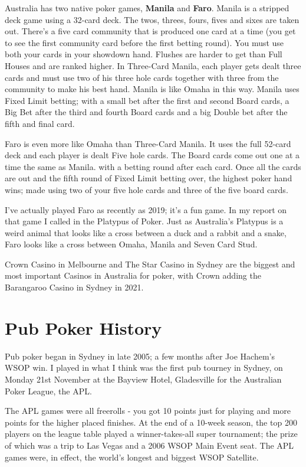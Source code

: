 Australia has two native poker games, \textbf{Manila} and
\textbf{Faro}. Manila is a stripped deck game using a 32-card
deck. The twos, threes, fours, fives and sixes are taken out.
There's a five card community that is produced one card at a time (you
get to see the first community card before the first betting round).
You must use both your cards in your showdown hand. Flushes are harder
to get than Full Houses and are ranked higher. In Three-Card Manila,
each player gets dealt three cards and must use two of his three hole
cards together with three from the community to make his best
hand. Manila is like Omaha in this way. Manila uses Fixed Limit
betting; with a small bet after the first and second Board cards, a
Big Bet after the third and fourth Board cards and a big Double bet
after the fifth and final card.

Faro is even more like Omaha than Three-Card Manila. It uses the full
52-card deck and each player is dealt Five hole cards. The Board
cards come out one at a time the same as Manila. with a betting round
after each card. Once all the cards are out and the fifth round of
Fixed Limit betting over, the highest poker hand wins; made using two
of your five hole cards and three of the five board cards.

I've actually played Faro as recently as 2019; it's a
fun game. In my report on that game I called in the Platypus of
Poker. Just as Australia's Platypus is a weird animal that looks like
a cross between a duck and a rabbit and a snake, Faro looks like a
cross between Omaha, Manila and Seven Card Stud.

Crown Casino in Melbourne and The Star Casino in Sydney are the
biggest and most important Casinos in Australia for poker, with Crown
adding the Barangaroo Casino in Sydney in 2021.

\section{Pub Poker History}

Pub poker began in Sydney in late 2005; a few months after Joe
Hachem's WSOP win. I played in what I think was the first pub tourney
in Sydney, on Monday 21st November at the Bayview Hotel, Gladesville
for the Australian Poker League, the APL.

The APL games were all freerolls - you got 10 points just for
playing and more points for the higher placed finishes. At the
end of a 10-week season, the top 200 players on the league table
played a winner-takes-all super tournament; the prize of which was a
trip to Las Vegas and a 2006 WSOP Main Event seat. The APL games were,
in effect, the world's longest and biggest WSOP Satellite.

